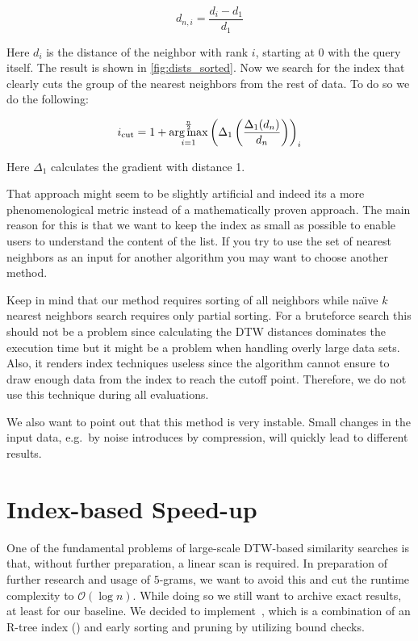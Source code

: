\begin{equation}\label{eq:dists_norm}
    d_{n,i} = \frac{d_i - d_1}{d_1}
\end{equation}

Here $d_i$ is the distance of the neighbor with rank $i$, starting at \num{0} with the query itself. The result is shown in \autoref{fig:dists_sorted}. Now we search for the index that clearly cuts the group of the nearest neighbors from the rest of data. To do so we do the following:

\begin{equation}\label{eq:dists_cut}
    i_\text{cut} = 1 + \operatorname*{arg\,max}_{i=1}^\frac{n}{2} \left( \Delta_1 \left( \frac{\Delta_1(d_n)}{d_n} \right) \right)_i
\end{equation}

Here $\Delta_1$ calculates the gradient with distance \num{1}.

That approach might seem to be slightly artificial and indeed its a more phenomenological metric instead of a mathematically proven approach. The main reason for this is that we want to keep the index as small as possible to enable users to understand the content of the list. If you try to use the set of nearest neighbors as an input for another algorithm you may want to choose another method.

Keep in mind that our method requires sorting of all neighbors while na{\"\i}ve $k$ nearest neighbors search requires only partial sorting. For a bruteforce search this should not be a problem since calculating the DTW distances dominates the execution time but it might be a problem when handling overly large data sets. Also, it renders index techniques useless since the algorithm cannot ensure to draw enough data from the index to reach the cutoff point. Therefore, we do not use this technique during all evaluations.

We also want to point out that this method is very instable. Small changes in the input data, e.g.\ by noise introduces by compression, will quickly lead to different results.



\section{Index-based Speed-up}
\label{sec:baseline:speed}

One of the fundamental problems of large-scale DTW-based similarity searches is that, without further preparation, a linear scan is required. In preparation of further research and usage of $5$-grams, we want to avoid this and cut the runtime complexity to $\mathcal{O}(\log{n})$. While doing so we still want to archive exact results, at least for our baseline. We decided to implement~\cite{LB_Keogh}, which is a combination of an R-tree index (\cite{rtree}) and early sorting and pruning by utilizing bound checks.


